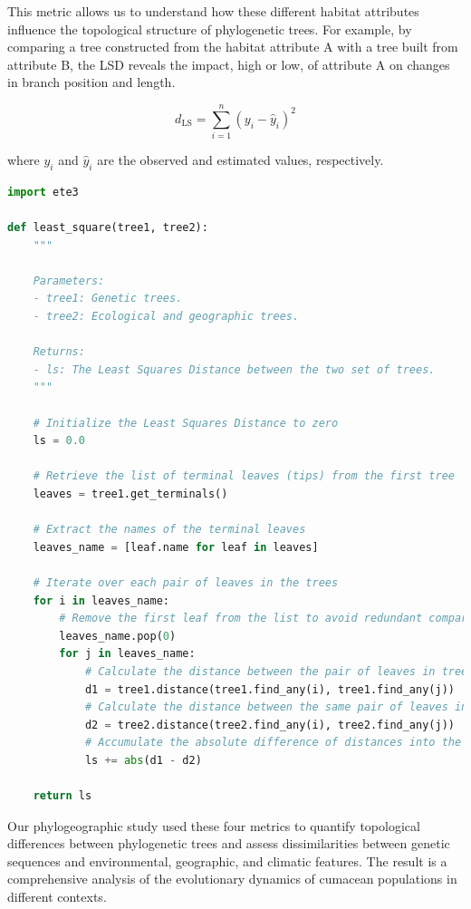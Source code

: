 This metric allows us to understand how these different habitat attributes influence the topological structure of phylogenetic trees. For example, by comparing a tree constructed from the habitat attribute A with a tree built from attribute B, the LSD reveals the impact, high or low, of attribute A on changes in branch position and length.

\begin{equation}\label{eq:ls}
    d_{\text{LS}} = \sum_{i=1}^{n} (y_i - \hat{y}_i)^2
\end{equation}

where $y_i$ and $\hat{y}_i$ are the observed and estimated values, respectively.

\begin{lstlisting}[label=lst:LeastSquare, language=Python, caption=Python script for calculating the LSD using the ete3 package in the aPhyloGeo package]
import ete3

def least_square(tree1, tree2):
    """
    
    Parameters:
    - tree1: Genetic trees.
    - tree2: Ecological and geographic trees.

    Returns:
    - ls: The Least Squares Distance between the two set of trees.
    """
    
    # Initialize the Least Squares Distance to zero
    ls = 0.0
    
    # Retrieve the list of terminal leaves (tips) from the first tree
    leaves = tree1.get_terminals()
    
    # Extract the names of the terminal leaves
    leaves_name = [leaf.name for leaf in leaves]
    
    # Iterate over each pair of leaves in the trees
    for i in leaves_name:
        # Remove the first leaf from the list to avoid redundant comparisons
        leaves_name.pop(0)
        for j in leaves_name:
            # Calculate the distance between the pair of leaves in tree1
            d1 = tree1.distance(tree1.find_any(i), tree1.find_any(j))
            # Calculate the distance between the same pair of leaves in tree2
            d2 = tree2.distance(tree2.find_any(i), tree2.find_any(j))
            # Accumulate the absolute difference of distances into the LSD
            ls += abs(d1 - d2)
    
    return ls
\end{lstlisting}

Our phylogeographic study used these four metrics to quantify topological differences between phylogenetic trees and assess dissimilarities between genetic sequences and environmental, geographic, and climatic features. The result is a comprehensive analysis of the evolutionary dynamics of cumacean populations in different contexts. 

